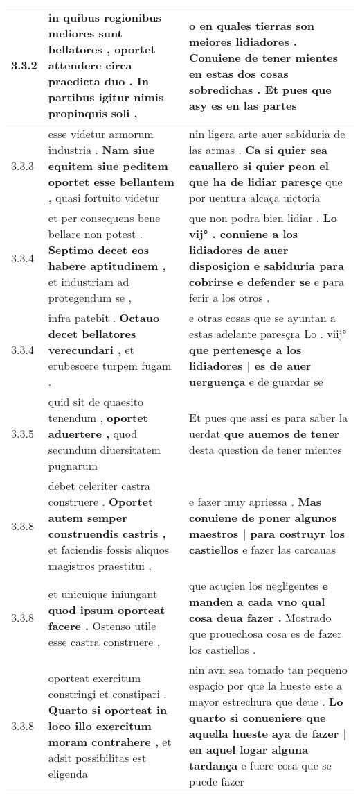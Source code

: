 \begin{tabular}{|p{1cm}|p{6.5cm}|p{6.5cm}|}
3.3.2 & in quibus regionibus meliores sunt bellatores , \textbf{ oportet attendere circa praedicta duo . } In partibus igitur nimis propinquis soli , & o en quales tierras son meiores lidiadores . \textbf{ Conuiene de tener mientes en estas dos cosas sobredichas . } Et pues que asy es en las partes \\\hline
3.3.3 & esse videtur armorum industria . \textbf{ Nam siue equitem siue peditem oportet esse bellantem , } quasi fortuito videtur & nin ligera arte auer sabiduria de las armas . \textbf{ Ca si quier sea cauallero si quier peon el que ha de lidiar paresçe } que por uentura alcaça uictoria \\\hline
3.3.4 & et per consequens bene bellare non potest . \textbf{ Septimo decet eos habere aptitudinem , } et industriam ad protegendum se , & que non podra bien lidiar . \textbf{ Lo vij° . conuiene a los lidiadores de auer disposiçion e sabiduria para cobrirse e defender se } e para ferir a los otros . \\\hline
3.3.4 & infra patebit . \textbf{ Octauo decet bellatores verecundari , } et erubescere turpem fugam . & e otras cosas que se ayuntan a estas adelante paresçra Lo . viij° \textbf{ que pertenesçe a los lidiadores | es de auer uerguença } e de guardar se \\\hline
3.3.5 & quid sit de quaesito tenendum , \textbf{ oportet aduertere , } quod secundum diuersitatem pugnarum & Et pues que assi es para saber la uerdat \textbf{ que auemos de tener } desta question de tener mientes \\\hline
3.3.8 & debet celeriter castra construere . \textbf{ Oportet autem semper construendis castris , } et faciendis fossis aliquos magistros praestitui , & e fazer muy apriessa . \textbf{ Mas conuiene de poner algunos maestros | para costruyr los castiellos } e fazer las carcauas \\\hline
3.3.8 & et unicuique iniungant \textbf{ quod ipsum oporteat facere . } Ostenso utile esse castra construere , & que acuçien los negligentes \textbf{ e manden a cada vno qual cosa deua fazer . } Mostrado que prouechosa cosa es de fazer los castiellos . \\\hline
3.3.8 & oporteat exercitum constringi et constipari . \textbf{ Quarto si oporteat in loco illo exercitum moram contrahere , } et adsit possibilitas est eligenda & nin avn sea tomado tan pequeno espaçio por que la hueste este a mayor estrechura que deue . \textbf{ Lo quarto si conueniere que aquella hueste aya de fazer | en aquel logar alguna tardança } e fuere cosa que se puede fazer \\\hline

\end{tabular}
